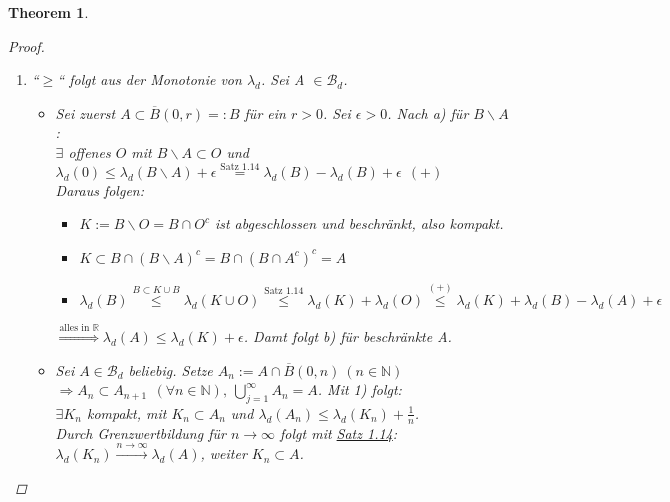 \documentclass[a4paper]{report}
\newcommand{\R}{\mathbb{R}}
\newcommand{\N}{\mathbb{N}}
\newcommand{\Borel}{\mathcal{B}}
\newcommand{\Bd}{\Borel_d}
\newcommand{\jshortlink}[1]{\jhyperref{#1}{\text{#1}}}
\newcommand{\jhyperref}[2]{\hyperref[j_#1]{#2}}
\newcommand{\jlink}[1]{\jhyperref{#1}{#1}}
\theoremstyle{plain}
\newtheorem{thm}{Theorem}[chapter]
\theoremstyle{definition}
\begin{document}
{{{\begin{thm}
\begin{proof}
\begin{enumerate}
            \item
                ``$\ge$`` folgt aus der Monotonie von $\lambda_d$. Sei A $\in \Bd$.
                    \begin{itemize}
                        \item[1)]
                            Sei zuerst $A\subset \overline{B}(0,r) =: B$ für ein $r>0$. Sei $\epsilon > 0$. Nach a) für $B\backslash A$:\\ 
                            $\exists$ offenes $O$ mit $B\backslash A \subset O$ und $\lambda_d(0) \le \lambda_d(B\backslash A) + \epsilon \overset{\jshortlink{Satz 1.14}}{=} \lambda_d(B) - \lambda_d(B) + \epsilon \ \ (+)$\\
                            Daraus folgen:
                            \begin{itemize}
                                \item $K := B\backslash O = B \cap O^c$ ist abgeschlossen und beschränkt, also kompakt.
                                \item $K \subset B \cap (B\backslash A)^c = B \cap (B\cap A^c)^c = A$
                                \item $\lambda_d(B) \overset{B \subset K\cup B}{\le} \lambda_d(K \cup O) \overset{\jshortlink{Satz 1.14}}{\le} \lambda_d(K) + \lambda_d(O) \overset{(+)}{\le} \lambda_d(K) + \lambda_d(B) - \lambda_d(A) + \epsilon$
                            \end{itemize}
                            $\overset{\text{alles in } \R}{\Rightarrow} \lambda_d(A) \le \lambda_d(K) + \epsilon$. Damt folgt b) für beschränkte A.
                        
                        \item[2)]
                            Sei $A\in \Bd$ beliebig. Setze $A_n := A\cap \overline{B}(0,n) \ (n\in\N)$\\
                            $\Rightarrow A_n \subset A_{n+1} \ \ (\forall n\in\N),\ \bigcup_{j=1}^\infty A_n = A$. Mit 1) folgt:\\
                            $\exists K_n$ kompakt, mit $K_n\subset A_n$ und $\lambda_d(A_n) \le \lambda_d(K_n) + \frac{1}{n}$.\\
                            Durch Grenzwertbildung für $n\rightarrow \infty$ folgt mit \jlink{Satz 1.14}:\\
                            $\lambda_d(K_n) \xrightarrow{n \rightarrow \infty} \lambda_d(A)$, weiter $K_n \subset A$.
                    \end{itemize}
         \end{enumerate}
    \end{proof}
\end{thm}

}}}
\end{document}
